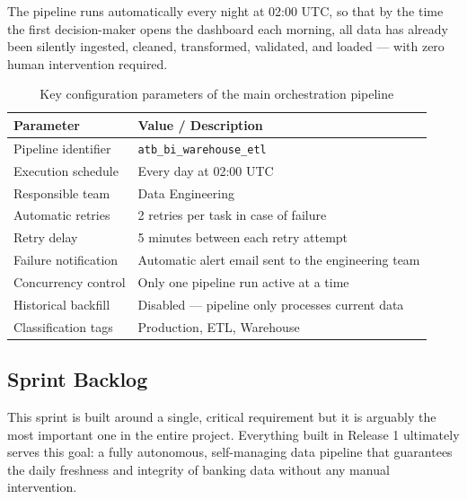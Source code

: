 The pipeline runs automatically every night at 02:00 UTC, so that by the time
the first decision-maker opens the dashboard each morning, all data has already been
silently ingested, cleaned, transformed, validated, and loaded — with zero human
intervention required.

\begin{table}[H]
\centering
\renewcommand{\arraystretch}{1.4}
\caption{Key configuration parameters of the main orchestration pipeline}
\label{tab:dag_config}
\begin{tabular}{|p{4.5cm}|p{9cm}|}
\hline
\rowcolor{blue!15}
\textbf{Parameter} & \textbf{Value / Description} \\
\hline
Pipeline identifier & \texttt{atb\_bi\_warehouse\_etl} \\
\hline
Execution schedule & Every day at 02:00 UTC \\
\hline
Responsible team & Data Engineering \\
\hline
Automatic retries & 2 retries per task in case of failure \\
\hline
Retry delay & 5 minutes between each retry attempt \\
\hline
Failure notification & Automatic alert email sent to the engineering team \\
\hline
Concurrency control & Only one pipeline run active at a time \\
\hline
Historical backfill & Disabled — pipeline only processes current data \\
\hline
Classification tags & Production, ETL, Warehouse \\
\hline
\end{tabular}
\end{table}

\subsection{Sprint Backlog}

This sprint is built around a single, critical requirement but it is arguably the
most important one in the entire project. Everything built in Release 1 ultimately
serves this goal: a fully autonomous, self-managing data pipeline that guarantees
the daily freshness and integrity of banking data without any manual intervention.

